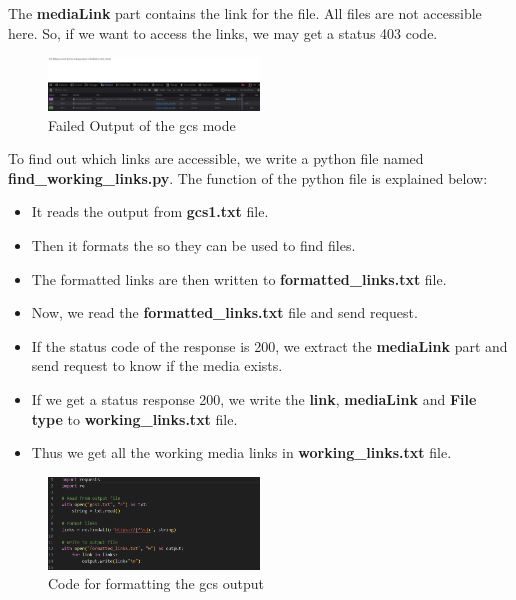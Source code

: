 \documentclass[12 pt]{article}
\begin{document}
\newline
The \textbf{mediaLink} part contains the link for the file. All files are not accessible here. So, if we want to access the links, we may get a status 403 code.
\begin{figure}[!htbp]
    \centering
    \includegraphics[width=0.5\textwidth]{gcs_Output_Fail.png}
    \caption{Failed Output of the gcs mode}
    \label{fig: gcs Output Fail}
\end{figure}
To find out which links are accessible, we write a python file named \textbf{find\_working\_links.py}. The function of the python file is explained below:
\begin{itemize}
    \item It reads the output from \textbf{gcs1.txt} file.
    \item Then it formats the so they can be used to find files.
    \item The formatted links are then written to \textbf{formatted\_links.txt} file.
    \item Now, we read the \textbf{formatted\_links.txt} file and send request.
    \item If the status code of the response is 200, we extract the \textbf{mediaLink} part and send request to know if the media exists.
    \item If we get a status response 200, we write the \textbf{link}, \textbf{mediaLink} and \textbf{File type} to \textbf{working\_links.txt} file.
    \item Thus we get all the working media links in \textbf{working\_links.txt} file.
\end{itemize}
\begin{figure}[!htbp]
    \centering
    \includegraphics[width=0.5\textwidth]{gcs_Output_Formatting_Code.png}
    \caption{Code for formatting the gcs output}
    \label{fig: gcs Output Formatting Code}
\end{figure}
\end{document}
